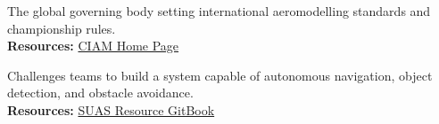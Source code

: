 \documentclass[11pt,a4paper]{article}
\begin{document}
\begin{description}[leftmargin=1.5em, labelindent=0em]
    \item[\color{LycansBlue}FAI Aeromodelling Commission (CIAM):] The global governing body setting international aeromodelling standards and championship rules.
    \\ \textbf{Resources:} \href{https://www.fai.org/commission/ciam}{CIAM Home Page}
    
    \item[\color{LycansBlue}SUAS (Student Unmanned Aerial Systems):] Challenges teams to build a system capable of autonomous navigation, object detection, and obstacle avoidance.
    \\ \textbf{Resources:} \href{https://robonation.gitbook.io/suas-resources}{SUAS Resource GitBook}
    
\end{description}
\end{document}
